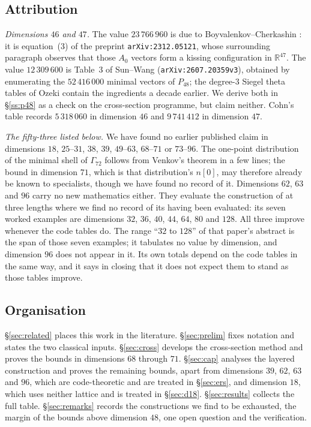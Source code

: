 \documentclass[11pt]{amsart}
\theoremstyle{remark}
\newcommand{\Pff}{P_{48}}
\newcommand{\Gsz}{\Gamma_{72}}
\newcommand{\R}{\mathbb{R}}
\begin{document}
\subsection{Attribution}\label{ss:new}

\begin{sloppypar}
\emph{Dimensions $46$ and $47$.} The value $23\,766\,960$ is due to
Boyvalenkov--Cherkashin \cite{boyvalenkov-cherkashin2025}: it is equation~(3) of
the preprint \texttt{arXiv:2312.05121}, whose surrounding paragraph observes that
those $A_0$ vectors form a kissing configuration in $\R^{47}$.
The value $12\,309\,600$ is Table~3 of Sun--Wang \cite{sun-wang2026}
(\texttt{arXiv:2607.20359v3}), obtained by
enumerating the $52\,416\,000$ minimal vectors of $\Pff$; the degree-$3$ Siegel
theta tables of Ozeki \cite{ozeki2016} contain the ingredients a decade earlier.
We derive both in \S\ref{ss:p48} as a check on the cross-section programme, but
claim neither. Cohn's table \cite{cohn-table} records
$5\,318\,060$ in dimension $46$ and $9\,741\,412$ in dimension $47$.
\end{sloppypar}

\emph{The fifty-three listed below.} We have found no earlier published claim in dimensions
$18$, $25$--$31$, $38$, $39$, $49$--$63$, $68$--$71$ or $73$--$96$. The one-point
distribution of the minimal shell of $\Gsz$ follows from Venkov's theorem in a
few lines; the bound in dimension $71$, which is that distribution's $n[0]$, may therefore
already be known to specialists, though we have found no record of it. Dimensions $62$, $63$ and $96$
carry no new mathematics either. They evaluate the construction of
\cite{edel-rains-sloane1998} at three lengths where we find no record of its having
been evaluated: its seven worked examples are dimensions $32$, $36$, $40$, $44$,
$64$, $80$ and $128$. All three improve whenever the code tables do. The range
``$32$ to $128$'' of that paper's abstract is the span of those seven examples; it
tabulates no value by dimension, and dimension $96$ does not appear in it. Its own
totals depend on the code tables in the same way, and it says in closing that it
does not expect them to stand as those tables improve.

\subsection{Organisation}

\S\ref{sec:related} places this work in the literature. \S\ref{sec:prelim} fixes
notation and states the two classical inputs. \S\ref{sec:cross} develops the
cross-section method and proves the bounds in dimensions $68$ through $71$.
\S\ref{sec:cap} analyses the layered construction and proves the remaining
bounds, apart from dimensions $39$, $62$, $63$ and $96$, which are code-theoretic and
are treated in \S\ref{sec:ers}, and dimension $18$, which uses neither lattice and
is treated in \S\ref{sec:d18}. \S\ref{sec:results} collects the full table.
\S\ref{sec:remarks} records the constructions we find to be exhausted, the margin
of the bounds above dimension $48$, one open question and the verification.
\end{document}
